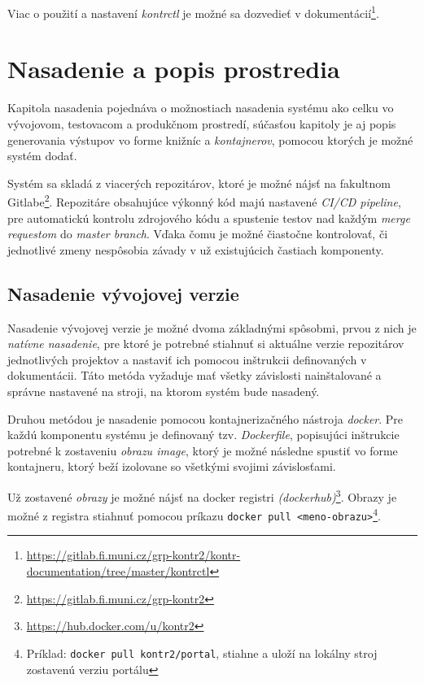 \documentclass[
  digital, %
  twoside, %
  table,   %
  lof,     %
  lot,     %
]{fithesis3}
\begin{document}
Viac o použití a nastavení \emph{kontrctl} je možné sa dozvedieť v dokumentácií\footnote{\url{https://gitlab.fi.muni.cz/grp-kontr2/kontr-documentation/tree/master/kontrctl}}.

\chapter{Nasadenie a popis prostredia}

Kapitola nasadenia pojednáva o možnostiach nasadenia systému ako celku vo vývojovom, testovacom a produkčnom prostredí, súčasťou kapitoly je aj popis generovania výstupov vo forme knižníc a \emph{kontajnerov}, pomocou ktorých je možné systém dodať.

Systém sa skladá z viacerých repozitárov, ktoré je možné nájsť na fakultnom Gitlabe\footnote{\url{https://gitlab.fi.muni.cz/grp-kontr2}}. Repozitáre obsahujúce výkonný kód majú nastavené \emph{CI/CD pipeline}, pre automatickú kontrolu zdrojového kódu a spustenie testov nad každým \emph{merge requestom} do \emph{master branch}. Vďaka čomu je možné čiastočne kontrolovať, či jednotlivé zmeny nespôsobia závady v už existujúcich častiach komponenty.

\section{Nasadenie vývojovej verzie}

Nasadenie vývojovej verzie je možné dvoma základnými spôsobmi, prvou z nich je \emph{natívne nasadenie}, pre ktoré je potrebné stiahnuť si aktuálne verzie repozitárov jednotlivých projektov a nastaviť ich pomocou inštrukcii definovaných v dokumentácii. Táto metóda vyžaduje mať všetky závislosti nainštalované a správne nastavené na stroji, na ktorom systém bude nasadený.

Druhou metódou je nasadenie pomocou kontajnerizačného nástroja \emph{docker}. Pre každú komponentu systému je definovaný tzv. \emph{Dockerfile}, popisujúci inštrukcie potrebné k zostaveniu \emph{obrazu \emph{image}}, ktorý je možné následne spustiť vo forme kontajneru, ktorý beží izolovane so všetkými svojimi závislosťami.

Už zostavené \emph{obrazy} je možné nájsť na docker registri \emph{(dockerhub)}\footnote{\url{https://hub.docker.com/u/kontr2}}. Obrazy je možné z registra stiahnuť pomocou príkazu \texttt{docker pull <meno-obrazu>}\footnote{Príklad: \texttt{docker pull kontr2/portal}, stiahne a uloží na lokálny stroj zostavenú verziu portálu}.
\end{document}
